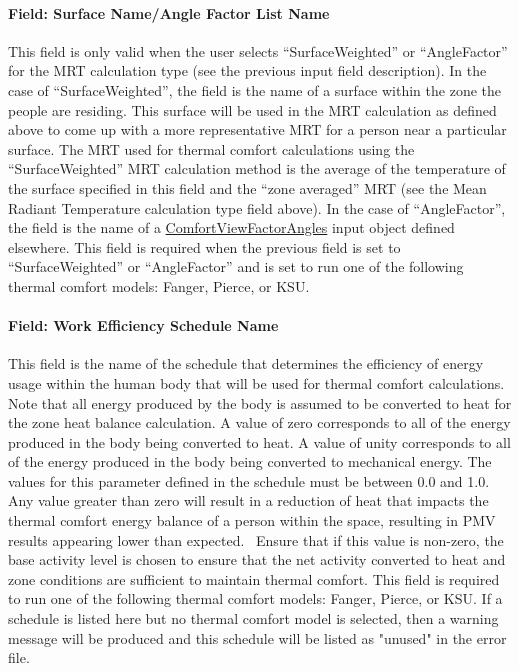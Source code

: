 \paragraph{Field: Surface Name/Angle Factor List Name}\label{field-surface-nameangle-factor-list-name}

This field is only valid when the user selects ``SurfaceWeighted'' or ``AngleFactor'' for the MRT calculation type (see the previous input field description). In the case of ``SurfaceWeighted'', the field is the name of a surface within the zone the people are residing. This surface will be used in the MRT calculation as defined above to come up with a more representative MRT for a person near a particular surface. The MRT used for thermal comfort calculations using the ``SurfaceWeighted'' MRT calculation method is the average of the temperature of the surface specified in this field and the ``zone averaged'' MRT (see the Mean Radiant Temperature calculation type field above). In the case of ``AngleFactor'', the field is the name of a \hyperref[comfortviewfactorangles]{ComfortViewFactorAngles} input object defined elsewhere. This field is required when the previous field is set to ``SurfaceWeighted'' or ``AngleFactor'' and is set to run one of the following thermal comfort models: Fanger, Pierce, or KSU.

\paragraph{Field: Work Efficiency Schedule Name}\label{field-work-efficiency-schedule-name}

This field is the name of the schedule that determines the efficiency of energy usage within the human body that will be used for thermal comfort calculations. Note that all energy produced by the body is assumed to be converted to heat for the zone heat balance calculation. A value of zero corresponds to all of the energy produced in the body being converted to heat. A value of unity corresponds to all of the energy produced in the body being converted to mechanical energy. The values for this parameter defined in the schedule must be between 0.0 and 1.0. Any value greater than zero will result in a reduction of heat that impacts the thermal comfort energy balance of a person within the space, resulting in PMV results appearing lower than expected.~ Ensure that if this value is non-zero, the base activity level is chosen to ensure that the net activity converted to heat and zone conditions are sufficient to maintain thermal comfort. This field is required to run one of the following thermal comfort models: Fanger, Pierce, or KSU. If a schedule is listed here but no thermal comfort model is selected, then a warning message will be produced and this schedule will be listed as "unused" in the error file.

